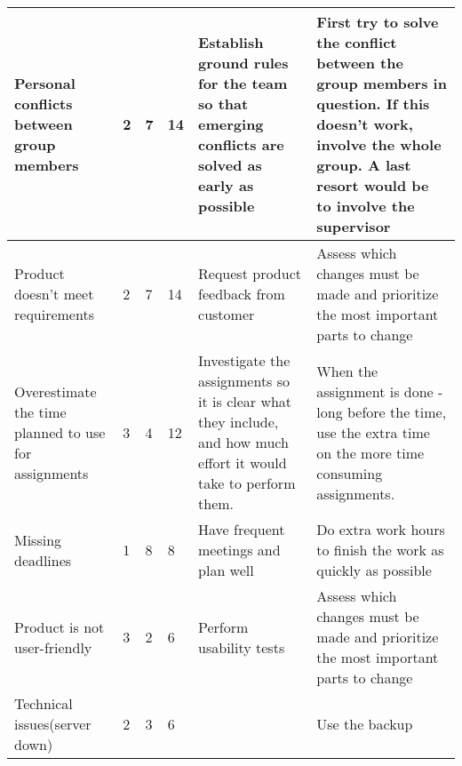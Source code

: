 \begin{longtable}{ | p{3.5cm} | p{2cm} | p{1.5cm} | p{2cm} | p{3.5cm} | p{3.5cm} |}
			Personal conflicts between group members & 2 & 7 & 14 & Establish ground rules for the team so that emerging conflicts are solved as early as possible & First try to solve the conflict between the group members in question. If this doesn't work, involve the whole group. A last resort would be to involve the supervisor \\ \hline
			
			Product doesn't meet requirements & 2 & 7 & 14 & Request product feedback from customer & Assess which changes must be made and prioritize the most important parts to change \\ \hline
			
			Overestimate the time planned to use for assignments & 3 & 4 & 12 & Investigate the assignments so it is clear what they include, and how much effort it would take to perform them. & When the assignment is done - long before the time, use the extra time on the more time consuming assignments. \\ \hline
			
			Missing deadlines & 1 & 8 & 8 & Have frequent meetings and plan well & Do extra work hours to finish the work as quickly as possible \\ \hline
			
			Product is not user-friendly & 3 & 2 & 6 & Perform usability tests & Assess which changes must be made and prioritize the most important parts to change \\ \hline
			
			Technical issues(server down) & 2 & 3 & 6 & & Use the backup \\ \hline
		\end{longtable}

\cleardoublepage